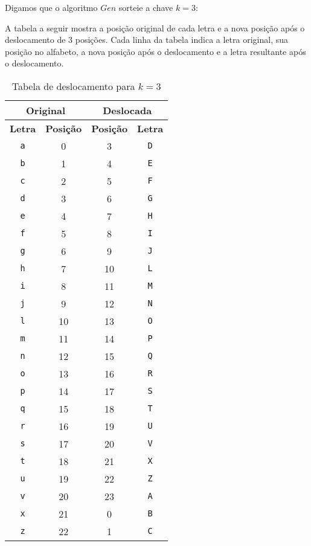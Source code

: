 \begin{example}
  Digamos que o algoritmo $Gen$ sorteie a chave $k = 3$:

  A tabela a seguir mostra a posição original de cada letra e a nova posição após o deslocamento de 3 posições.
  Cada linha da tabela indica a letra original, sua posição no alfabeto, a nova posição após o deslocamento e a letra resultante após o deslocamento.

  
  \begin{table}[h!]
    \centering
    \begin{tabular}{|c|c|c|c|}
      \hline
      \multicolumn{2}{|c|}{\textbf{Original}} & \multicolumn{2}{c|}{\textbf{Deslocada}} \\
      \hline
      \textbf{Letra} & \textbf{Posição} & \textbf{Posição} & \textbf{Letra} \\
      \hline
      \texttt{a} & 0 & 3 & \texttt{D} \\
      \hline
      \texttt{b} & 1 & 4 & \texttt{E} \\
      \hline
      \texttt{c} & 2 & 5 & \texttt{F} \\
      \hline
      \texttt{d} & 3 & 6 & \texttt{G} \\
      \hline
      \texttt{e} & 4 & 7 & \texttt{H} \\
      \hline
      \texttt{f} & 5 & 8 & \texttt{I} \\
      \hline
      \texttt{g} & 6 & 9 & \texttt{J} \\
      \hline
      \texttt{h} & 7 & 10 & \texttt{L} \\
      \hline
      \texttt{i} & 8 & 11 & \texttt{M} \\
      \hline
      \texttt{j} & 9 & 12 & \texttt{N} \\
      \hline
      \texttt{l} & 10 & 13 & \texttt{O} \\
      \hline
      \texttt{m} & 11 & 14 & \texttt{P} \\
      \hline
      \texttt{n} & 12 & 15 & \texttt{Q} \\
      \hline
      \texttt{o} & 13 & 16 & \texttt{R} \\
      \hline
      \texttt{p} & 14 & 17 & \texttt{S} \\
      \hline
      \texttt{q} & 15 & 18 & \texttt{T} \\
      \hline
      \texttt{r} & 16 & 19 & \texttt{U} \\
      \hline
      \texttt{s} & 17 & 20 & \texttt{V} \\
      \hline
      \texttt{t} & 18 & 21 & \texttt{X} \\
      \hline
      \texttt{u} & 19 & 22 & \texttt{Z} \\
      \hline
      \texttt{v} & 20 & 23 & \texttt{A} \\
      \hline
      \texttt{x} & 21 & 0 & \texttt{B} \\
      \hline
      \texttt{z} & 22 & 1 & \texttt{C} \\
      \hline
    \end{tabular}
    \caption{Tabela de deslocamento para $k=3$}
    \label{table:cesar_shift}
  \end{table}


\end{example}
